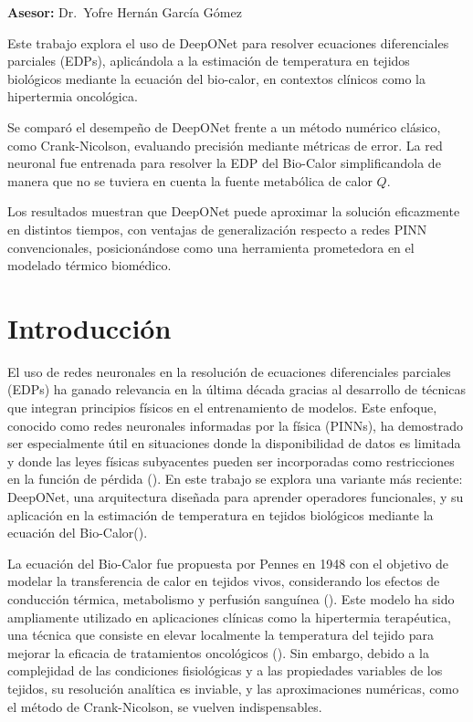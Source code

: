 \documentclass[
  spanish,
  us-letterpaper,
]{scrreprt}
\theoremstyle{definition}
\theoremstyle{plain}
\theoremstyle{remark}
\begin{document}
\textbf{Asesor:} Dr.~Yofre Hernán García Gómez

Este trabajo explora el uso de DeepONet para resolver ecuaciones
diferenciales parciales (EDPs), aplicándola a la estimación de
temperatura en tejidos biológicos mediante la ecuación del bio-calor, en
contextos clínicos como la hipertermia oncológica.

Se comparó el desempeño de DeepONet frente a un método numérico clásico,
como Crank-Nicolson, evaluando precisión mediante métricas de error. La
red neuronal fue entrenada para resolver la EDP del Bio-Calor
simplificandola de manera que no se tuviera en cuenta la fuente
metabólica de calor \(Q\).

Los resultados muestran que DeepONet puede aproximar la solución
eficazmente en distintos tiempos, con ventajas de generalización
respecto a redes PINN convencionales, posicionándose como una
herramienta prometedora en el modelado térmico biomédico.


\chapter{Introducción}\label{introducciuxf3n}

El uso de redes neuronales en la resolución de ecuaciones diferenciales
parciales (EDPs) ha ganado relevancia en la última década gracias al
desarrollo de técnicas que integran principios físicos en el
entrenamiento de modelos. Este enfoque, conocido como redes neuronales
informadas por la física (PINNs), ha demostrado ser especialmente útil
en situaciones donde la disponibilidad de datos es limitada y donde las
leyes físicas subyacentes pueden ser incorporadas como restricciones en
la función de pérdida (). En este trabajo se explora una variante más
reciente: DeepONet, una arquitectura diseñada para aprender operadores
funcionales, y su aplicación en la estimación de temperatura en tejidos
biológicos mediante la ecuación del Bio-Calor().

La ecuación del Bio-Calor fue propuesta por Pennes en 1948 con el
objetivo de modelar la transferencia de calor en tejidos vivos,
considerando los efectos de conducción térmica, metabolismo y perfusión
sanguínea (). Este modelo ha sido
ampliamente utilizado en aplicaciones clínicas como la hipertermia
terapéutica, una técnica que consiste en elevar localmente la
temperatura del tejido para mejorar la eficacia de tratamientos
oncológicos (). Sin embargo, debido a la complejidad de las condiciones
fisiológicas y a las propiedades variables de los tejidos, su resolución
analítica es inviable, y las aproximaciones numéricas, como el método de
Crank-Nicolson, se vuelven indispensables.
\end{document}
